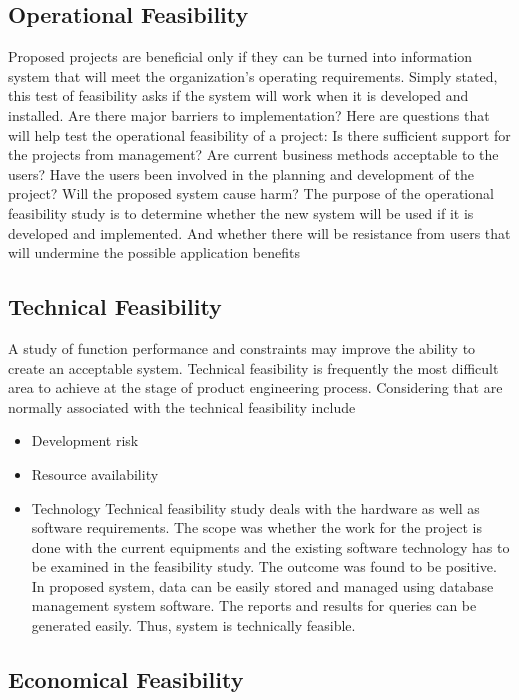 \documentclass[12pt]{article}
\begin{document}
\begin{enumerate}
\subsection{ Operational Feasibility}
Proposed projects are beneficial only if they can be turned into information system
that will meet the organization’s operating requirements. Simply stated, this test of
feasibility asks if the system will work when it is developed and installed. Are there
major barriers to implementation? Here are questions that will help test the operational
feasibility of a project:
Is there sufficient support for the projects from management?
Are current business methods acceptable to the users?
Have the users been involved in the planning and development of the project?
Will the proposed system cause harm? The purpose of the operational feasibility
study is to determine whether the new system will be used if it is developed and
implemented. And whether there will be resistance from users that will undermine the
possible application benefits
\subsection{Technical Feasibility}
A study of function performance and constraints may improve the ability to create an
acceptable system. Technical feasibility is frequently the most difficult area to achieve
at the stage of product engineering process. Considering that are normally associated
with the technical feasibility include
\begin{itemize}
\item Development risk
\item Resource availability
\item Technology Technical feasibility study deals with the hardware as well as software
requirements. The scope was whether the work for the project is done with the current
equipments and the existing software technology has to be examined in the feasibility
study. The outcome was found to be positive. In proposed system, data can be easily
stored and managed using database management system software. The reports and
results for queries can be generated easily. Thus, system is technically feasible.

\end{itemize}


\subsection{Economical Feasibility  }


\end{enumerate}
\end{document}
